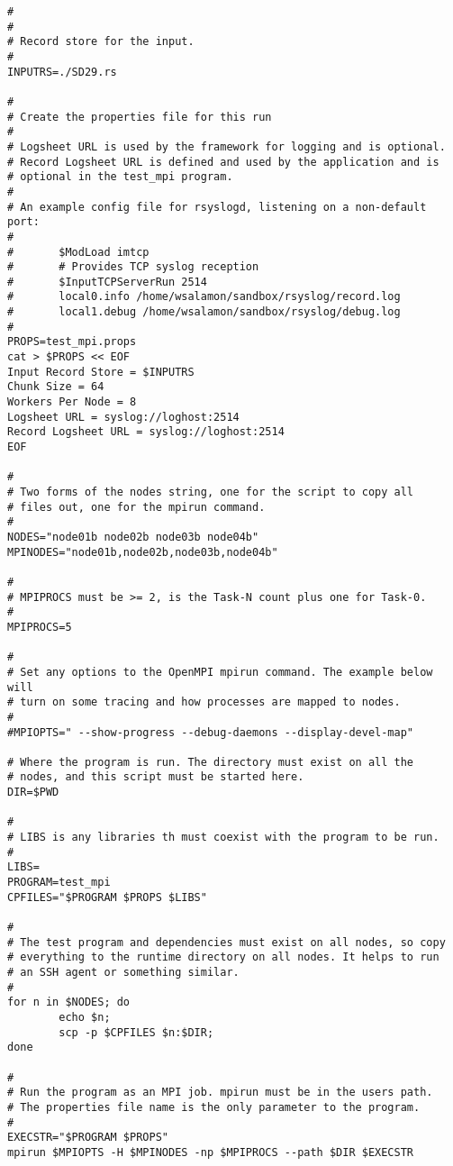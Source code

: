\begin{lstlisting}[caption={Example Script to run MPI}, label=lst:mpijob]
#
#
# Record store for the input.
#
INPUTRS=./SD29.rs

#
# Create the properties file for this run
#
# Logsheet URL is used by the framework for logging and is optional.
# Record Logsheet URL is defined and used by the application and is
# optional in the test_mpi program.
#
# An example config file for rsyslogd, listening on a non-default port:
#
#       $ModLoad imtcp
#       # Provides TCP syslog reception
#       $InputTCPServerRun 2514
#       local0.info /home/wsalamon/sandbox/rsyslog/record.log
#       local1.debug /home/wsalamon/sandbox/rsyslog/debug.log
#
PROPS=test_mpi.props
cat > $PROPS << EOF
Input Record Store = $INPUTRS
Chunk Size = 64
Workers Per Node = 8
Logsheet URL = syslog://loghost:2514
Record Logsheet URL = syslog://loghost:2514
EOF

#
# Two forms of the nodes string, one for the script to copy all
# files out, one for the mpirun command.
#
NODES="node01b node02b node03b node04b"
MPINODES="node01b,node02b,node03b,node04b"

#
# MPIPROCS must be >= 2, is the Task-N count plus one for Task-0.
#
MPIPROCS=5

#
# Set any options to the OpenMPI mpirun command. The example below will
# turn on some tracing and how processes are mapped to nodes.
#
#MPIOPTS=" --show-progress --debug-daemons --display-devel-map"

# Where the program is run. The directory must exist on all the
# nodes, and this script must be started here.
DIR=$PWD

#
# LIBS is any libraries th must coexist with the program to be run.
#
LIBS=
PROGRAM=test_mpi
CPFILES="$PROGRAM $PROPS $LIBS"

#
# The test program and dependencies must exist on all nodes, so copy
# everything to the runtime directory on all nodes. It helps to run
# an SSH agent or something similar.
#
for n in $NODES; do
        echo $n;
        scp -p $CPFILES $n:$DIR;
done

#
# Run the program as an MPI job. mpirun must be in the users path.
# The properties file name is the only parameter to the program.
#
EXECSTR="$PROGRAM $PROPS"
mpirun $MPIOPTS -H $MPINODES -np $MPIPROCS --path $DIR $EXECSTR
\end{lstlisting}
